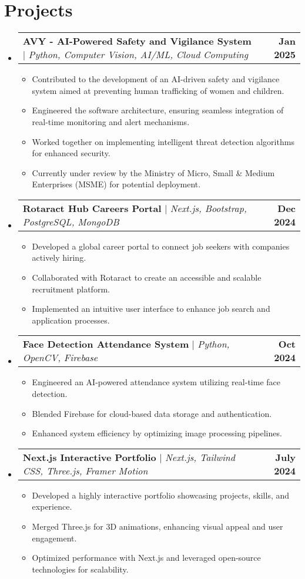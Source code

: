 \documentclass[letterpaper,11pt]{article}
\makeatletter
\newcommand{\resumeItem}[1]{
  \item\small{
    {#1 \vspace{-2pt}}
  }
}
\newcommand{\resumeProjectHeading}[2]{
    \item
    \begin{tabular*}{1.001\textwidth}{l@{\extracolsep{\fill}}r}
      \small#1 & \textbf{\small #2}\\
    \end{tabular*}\vspace{-7pt}
}
\newcommand{\resumeSubHeadingListStart}{\begin{itemize}[leftmargin=0.0in, label={}]}
\newcommand{\resumeSubHeadingListEnd}{\end{itemize}}
\newcommand{\resumeItemListStart}{\begin{itemize}}
\newcommand{\resumeItemListEnd}{\end{itemize}\vspace{-5pt}}
\makeatother
\begin{document}
\section{Projects}
    \vspace{-5pt}
    \resumeSubHeadingListStart
      \resumeProjectHeading
          {\textbf{AVY - AI-Powered Safety and Vigilance System} $|$ \emph{Python, Computer Vision, AI/ML, Cloud Computing}}{Jan 2025}
          \resumeItemListStart
            \resumeItem{Contributed to the development of an AI-driven safety and vigilance system aimed at preventing human trafficking of women and children.}
            \resumeItem{Engineered the software architecture, ensuring seamless integration of real-time monitoring and alert mechanisms.}
            \resumeItem{Worked together on implementing intelligent threat detection algorithms for enhanced security.}
            \resumeItem{Currently under review by the Ministry of Micro, Small \& Medium Enterprises (MSME) for potential deployment.}
          \resumeItemListEnd 
          \vspace{-13pt}
      \resumeProjectHeading
          {\textbf{Rotaract Hub Careers Portal} $|$ \emph{Next.js, Bootstrap, PostgreSQL, MongoDB}}{Dec 2024}
          \resumeItemListStart
            \resumeItem{Developed a global career portal to connect job seekers with companies actively hiring.}
            \resumeItem{Collaborated with Rotaract to create an accessible and scalable recruitment platform.}
            \resumeItem{Implemented an intuitive user interface to enhance job search and application processes.}
          \resumeItemListEnd 
          \vspace{-13pt}
      \resumeProjectHeading
          {\textbf{Face Detection Attendance System} $|$ \emph{Python, OpenCV, Firebase}}{Oct 2024}
          \resumeItemListStart
            \resumeItem{Engineered an AI-powered attendance system utilizing real-time face detection.}
            \resumeItem{Blended Firebase for cloud-based data storage and authentication.}
            \resumeItem{Enhanced system efficiency by optimizing image processing pipelines.}
          \resumeItemListEnd 
          \vspace{-13pt}
      \resumeProjectHeading
          {\textbf{Next.js Interactive Portfolio} $|$ \emph{Next.js, Tailwind CSS, Three.js, Framer Motion}}{July 2024}
          \resumeItemListStart
            \resumeItem{Developed a highly interactive portfolio showcasing projects, skills, and experience.}
            \resumeItem{Merged Three.js for 3D animations, enhancing visual appeal and user engagement.}
            \resumeItem{Optimized performance with Next.js and leveraged open-source technologies for scalability.}
          \resumeItemListEnd 
    \resumeSubHeadingListEnd
\vspace{-15pt}
\end{document}
